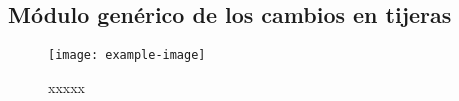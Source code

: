 \subsection{Módulo genérico de los cambios en tijeras}

\lipsum[1]

\begin{figure}[H]
	\centering
	\texttt{[image: example-image]}
	\centering\caption{xxxxx}
	\label{fig:XXXX}
\end{figure}

\lipsum[1]